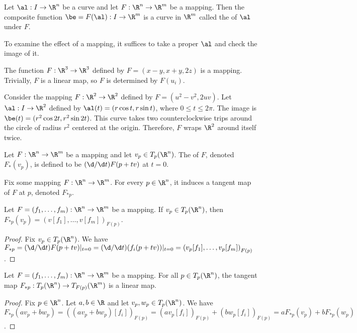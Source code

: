 \documentclass[10pt]{article}
\begin{document}
\begin{definition}
    Let $\al:I\to{\R}^{n}$ be a curve and let $F:{\R}^{n}\to{\R}^{m}$ be a mapping. Then the composite function $\be=F(\al):I\to{\R}^{m}$ is a curve in ${\R}^{m}$ called the  of $\al$ under $F$.
\end{definition}
\par
To examine the effect of a mapping, it suffices to take a proper $\al$ and check the image of it.
\begin{example}
    The function $F:{\R}^{3}\to{\R}^{3}$ defined by $F=(x-y,x+y,2z)$ is a mapping. Trivially, $F$ is a linear map, so $F$ is determined by $F({u}_{i})$.
\end{example}
\begin{example}
    Consider the mapping $F:{\R}^{2}\to{\R}^{2}$ defined by $F=({u}^{2}-{v}^{2},2uv)$. Let $\al:I\to{\R}^{2}$ defined by $\al(t)=(r\cos t,r\sin t)$, where $0\le t\le 2\pi$. The image is $\be(t)=({r}^{2}\cos 2t,{r}^{2}\sin 2t)$. This curve takes two counterclockwise trips around the circle of radius ${r}^{2}$ centered at the origin. Therefore, $F$ wraps ${\R}^{2}$ around itself twice.
\end{example}
\begin{definition}
    Let $F:{\R}^{n}\to{\R}^{m}$ be a mapping and let ${v}_{p}\in{T}_{p}({\R}^{n})$. The  of $F$, denoted ${F}_{*}({v}_{p})$, is defined to be $(\d/\d t)F(p+tv)$ at $t=0$.
\end{definition}
\par
Fix some mapping $F:{\R}^{n}\to{\R}^{m}$. For every $p\in{\R}^{n}$, it induces a tangent map of $F$ at $p$, denoted ${F}_{*p}$.
\begin{proposition}
    Let $F=({f}_{1},\dots,{f}_{m}):{\R}^{n}\to{\R}^{m}$ be a mapping. If ${v}_{p}\in{T}_{p}({\R}^{n})$, then ${F}_{*p}({v}_{p})={(v[{f}_{1}],\dots,v[{f}_{m}])}_{F(p)}$.
\end{proposition}
\begin{proof}
    Fix ${v}_{p}\in{T}_{p}({\R}^{n})$. We have ${F}_{*p}=(\d/\d t)F(p+tv){\vert}_{t=0}=(\d/\d t)({f}_{i}(p+tv)){\vert}_{t=0}={({v}_{p}[{f}_{1}],\dots,{v}_{p}[{f}_{m}])}_{F(p)}$.
\end{proof}
\begin{proposition}
    Let $F=({f}_{1},\dots,{f}_{m}):{\R}^{n}\to{\R}^{m}$ be a mapping. For all $p\in{T}_{p}({\R}^{n})$,  the tangent map ${F}_{*p}:{T}_{p}({\R}^{n})\to{T}_{F(p)}({\R}^{m})$ is a linear map.
\end{proposition}
\begin{proof}
    Fix $p\in{\R}^{n}$. Let $a,b\in\R$ and let ${v}_{p},{w}_{p}\in{T}_{p}({\R}^{n})$. We have ${F}_{*p}(a{v}_{p}+b{w}_{p})={((a{v}_{p}+b{w}_{p})[{f}_{i}])}_{F(p)}={(a{v}_{p}[{f}_{i}])}_{F(p)}+{(b{w}_{p}[{f}_{i}])}_{F(p)}=a{F}_{*p}({v}_{p})+b{F}_{*p}({w}_{p})$.
\end{proof}
\end{document}
